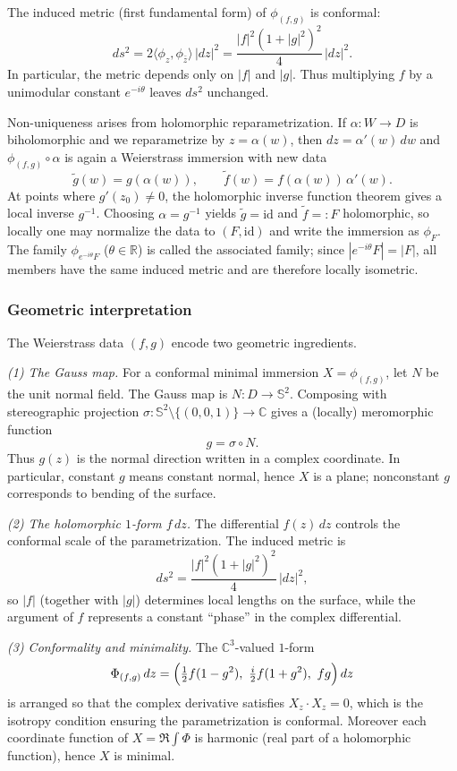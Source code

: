 \documentclass[12pt,a4paper]{article}
\theoremstyle{plain}
\theoremstyle{definition}      %
\begin{document}
\smallskip
The induced metric (first fundamental form) of $\phi_{(f,g)}$ is conformal:
\[
ds^2
=
2\langle \phi_z,\phi_{\bar z}\rangle\,|dz|^2
=
\frac{|f|^2(1+|g|^2)^2}{4}\,|dz|^2.
\]
In particular, the metric depends only on $|f|$ and $|g|$. Thus multiplying $f$ by a unimodular constant
$e^{-i\theta}$ leaves $ds^2$ unchanged.

\smallskip
Non-uniqueness arises from holomorphic reparametrization.
If $\alpha:W\to D$ is biholomorphic and we reparametrize by $z=\alpha(w)$, then $dz=\alpha'(w)\,dw$ and
$\phi_{(f,g)}\circ\alpha$ is again a Weierstrass immersion with new data
\[
\tilde g(w)=g(\alpha(w)),
\qquad
\tilde f(w)=f(\alpha(w))\,\alpha'(w).
\]
At points where $g'(z_0)\neq 0$, the holomorphic inverse function theorem gives a local inverse $g^{-1}$.
Choosing $\alpha=g^{-1}$ yields $\tilde g=\mathrm{id}$ and $\tilde f=:F$ holomorphic, so locally one may normalize the data to
$(F,\mathrm{id})$ and write the immersion as $\phi_F$.
The family $\phi_{e^{-i\theta}F}$ ($\theta\in\mathbb R$) is called the associated family; since $|e^{-i\theta}F|=|F|$, all
members have the same induced metric and are therefore locally isometric.

\medskip

\subsubsection*{Geometric interpretation}
The Weierstrass data $(f,g)$ encode two geometric ingredients.

\smallskip
\emph{(1) The Gauss map.}
For a conformal minimal immersion $X=\phi_{(f,g)}$, let $N$ be the unit normal field.
The Gauss map is $N:D\to\mathbb S^2$. Composing with stereographic projection
$\sigma:\mathbb S^2\setminus\{(0,0,1)\}\to\mathbb C$ gives a (locally) meromorphic function
\[
g=\sigma\circ N.
\]
Thus $g(z)$ is the normal direction written in a complex coordinate. In particular, constant $g$ means constant normal,
hence $X$ is a plane; nonconstant $g$ corresponds to bending of the surface.

\smallskip
\emph{(2) The holomorphic $1$-form $f\,dz$.}
The differential $f(z)\,dz$ controls the conformal scale of the parametrization. The induced metric is
\[
ds^2=\frac{|f|^2(1+|g|^2)^2}{4}\,|dz|^2,
\]
so $|f|$ (together with $|g|$) determines local lengths on the surface, while the argument of $f$ represents a constant
``phase'' in the complex differential.

\smallskip
\emph{(3) Conformality and minimality.}
The $\mathbb C^3$-valued $1$-form
\[
\Phi_{(f,g)}\,dz
=
\Bigl(\tfrac12 f(1-g^2),\ \tfrac{i}{2}f(1+g^2),\ fg\Bigr)\,dz
\]
is arranged so that the complex derivative satisfies $X_z\cdot X_z=0$, which is the isotropy condition ensuring the
parametrization is conformal. Moreover each coordinate function of $X=\Re\int \Phi$ is harmonic (real part of a holomorphic
function), hence $X$ is minimal.
\end{document}
